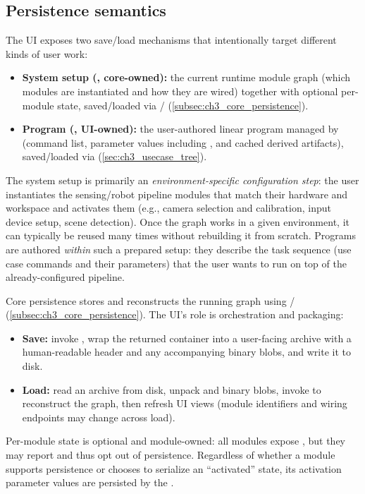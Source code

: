 
\subsection{Persistence semantics} \label{sec:ch3_persistence_semantics}

The UI exposes two save/load mechanisms that intentionally target different kinds of user work:
\begin{itemize}
    \item \textbf{System setup (, core-owned):} the current runtime module graph (which modules are instantiated and how they are wired) together with optional per-module state, saved/loaded via / (\autoref{subsec:ch3_core_persistence}).
    \item \textbf{Program (, UI-owned):} the user-authored linear program managed by  (command list, parameter values including , and cached derived artifacts), saved/loaded via  (\autoref{sec:ch3_usecase_tree}).
\end{itemize}

The system setup is primarily an \emph{environment-specific configuration step}: the user instantiates the sensing/robot pipeline modules that match their hardware and workspace and activates them (e.g., camera selection and calibration, input device setup, scene detection). Once the graph works in a given environment, it can typically be reused many times without rebuilding it from scratch.
Programs are authored \emph{within} such a prepared setup: they describe the task sequence (use case commands and their parameters) that the user wants to run on top of the already-configured pipeline.

Core persistence stores and reconstructs the running graph using / (\autoref{subsec:ch3_core_persistence}). The UI's role is orchestration and packaging:
\begin{itemize}
    \item \textbf{Save:} invoke , wrap the returned container into a user-facing  archive with a human-readable  header and any accompanying binary blobs, and write it to disk.
    \item \textbf{Load:} read an  archive from disk, unpack  and binary blobs, invoke  to reconstruct the graph, then refresh UI views (module identifiers and wiring endpoints may change across load).
\end{itemize}
Per-module state is optional and module-owned: all modules expose , but they may report  and thus opt out of persistence. Regardless of whether a module supports persistence or chooses to serialize an ``activated'' state, its activation parameter values are persisted by the . 

